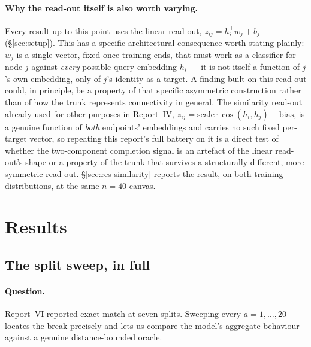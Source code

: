 \documentclass[11pt,a4paper]{article}
\begin{document}
\paragraph{Why the read-out itself is also worth varying.} Every result up to this point uses
the linear read-out, $z_{ij}=h_i^\top w_j+b_j$ (\S\ref{sec:setup}). This has a specific
architectural consequence worth stating plainly: $w_j$ is a single vector, fixed once training
ends, that must work as a classifier for node $j$ against \emph{every} possible query
embedding $h_i$ --- it is not itself a function of $j$'s own embedding, only of $j$'s identity
as a target. A finding built on this read-out could, in principle, be a property of that
specific asymmetric construction rather than of how the trunk represents connectivity in
general. The similarity read-out already used for other purposes in Report~IV,
$z_{ij}=\mathrm{scale}\cdot\cos(h_i,h_j)+\mathrm{bias}$, is a genuine function of \emph{both}
endpoints' embeddings and carries no such fixed per-target vector, so repeating this report's
full battery on it is a direct test of whether the two-component completion signal is an
artefact of the linear read-out's shape or a property of the trunk that survives a
structurally different, more symmetric read-out. \S\ref{sec:res-similarity} reports the
result, on both training distributions, at the same $n=40$ canvas.

\section{Results}
\label{sec:results}

\subsection{The split sweep, in full}
\label{sec:res-sweep}

\paragraph{Question.} Report~VI reported exact match at seven splits. Sweeping
every $a=1,\dots,20$ locates the break precisely and lets us compare the
model's aggregate behaviour against a genuine distance-bounded oracle.
\end{document}
